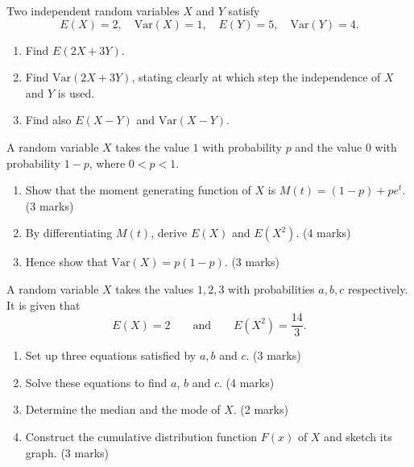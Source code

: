 \documentclass[11pt]{article}
\newcounter{popsec}
\newcounter{popsub}
\newcommand{\courssub}[1]{%
  \stepcounter{popsub}%
  \par\vspace{9pt}\noindent{\popxbold\fontsize{11.5}{13}\selectfont\color{popink}{\color{poporange}\thepopsec.\thepopsub}\hspace{6pt}#1}\par\nopagebreak\vspace{4pt}
}
\begin{document}
\begin{exercice}
Two independent random variables $X$ and $Y$ satisfy
\[ E(X) = 2, \quad \mathrm{Var}(X) = 1, \quad E(Y) = 5, \quad \mathrm{Var}(Y) = 4. \]
\begin{enumerate}
\item Find $E(2X + 3Y)$.
\item Find $\mathrm{Var}(2X + 3Y)$, stating clearly at which step the independence of $X$ and $Y$ is used.
\item Find also $E(X - Y)$ and $\mathrm{Var}(X - Y)$.
\end{enumerate}
\end{exercice}

\courssub{I prepare for the GCE}

\begin{exercice}
A random variable $X$ takes the value $1$ with probability $p$ and the value $0$ with probability $1 - p$, where $0 < p < 1$.
\begin{enumerate}
\item Show that the moment generating function of $X$ is $M(t) = (1 - p) + pe^{t}$. \hfill (3 marks)
\item By differentiating $M(t)$, derive $E(X)$ and $E(X^2)$. \hfill (4 marks)
\item Hence show that $\mathrm{Var}(X) = p(1 - p)$. \hfill (3 marks)
\end{enumerate}
\end{exercice}

\begin{exercice}
A random variable $X$ takes the values $1, 2, 3$ with probabilities $a, b, c$ respectively. It is given that
\[ E(X) = 2 \qquad \text{and} \qquad E(X^2) = \frac{14}{3}. \]
\begin{enumerate}
\item Set up three equations satisfied by $a, b$ and $c$. \hfill (3 marks)
\item Solve these equations to find $a$, $b$ and $c$. \hfill (4 marks)
\item Determine the median and the mode of $X$. \hfill (2 marks)
\item Construct the cumulative distribution function $F(x)$ of $X$ and sketch its graph. \hfill (3 marks)
\end{enumerate}
\end{exercice}
\end{document}
